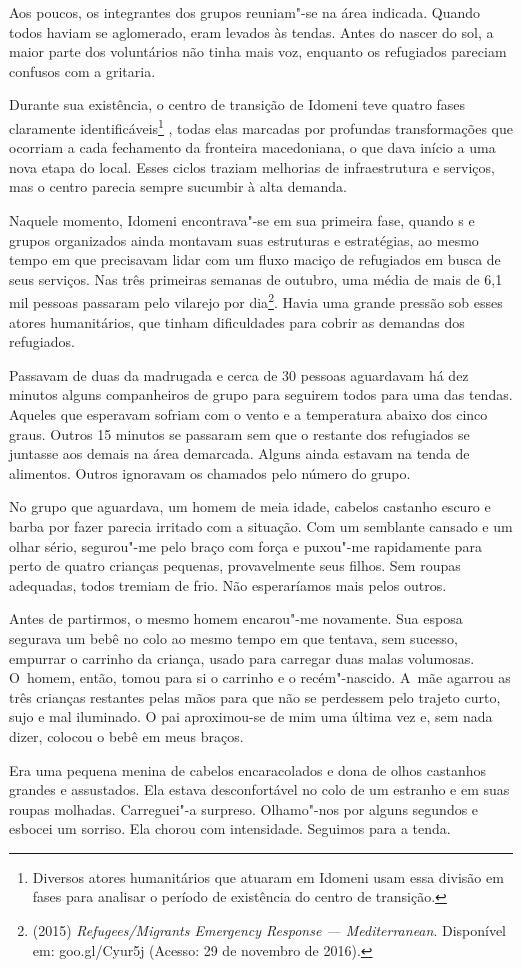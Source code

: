 Aos poucos, os integrantes dos grupos reuniam"-se na área indicada.
Quando todos haviam se aglomerado, eram levados às tendas. Antes do
nascer do sol, a maior parte dos voluntários não tinha mais voz,
enquanto os refugiados pareciam confusos com a gritaria.

Durante sua existência, o centro de transição de Idomeni teve quatro
fases claramente identificáveis\footnote{ Diversos atores humanitários que atuaram em Idomeni
usam essa divisão em fases para analisar o período de existência do
centro de transição.} , todas elas marcadas
por profundas transformações que ocorriam a cada fechamento da fronteira
macedoniana, o que dava início a uma nova etapa do local. Esses ciclos
traziam melhorias de infraestrutura e serviços, mas o centro parecia
sempre sucumbir à alta demanda.

Naquele momento, Idomeni encontrava"-se em sua primeira fase, quando s
e grupos organizados ainda montavam suas estruturas e estratégias, ao
mesmo tempo em que precisavam lidar com um fluxo maciço de refugiados em
busca de seus serviços. Nas três primeiras semanas de outubro, uma média
de mais de 6,1 mil pessoas passaram pelo vilarejo por
dia\footnote{  (2015) \emph{Refugees/Migrants Emergency
Response --- Mediterranean}. Disponível em:
goo.gl/Cyur5j (Acesso: 29 de
novembro de 2016).}. Havia uma grande pressão sob esses atores
humanitários, que tinham dificuldades para cobrir as demandas dos
refugiados.

Passavam de duas da madrugada e cerca de 30 pessoas aguardavam há dez
minutos alguns companheiros de grupo para seguirem todos para uma 
das tendas. Aqueles que esperavam sofriam com o vento e a
temperatura abaixo dos cinco graus. Outros 15 minutos se passaram sem
que o restante dos refugiados se juntasse aos demais na área demarcada.
Alguns ainda estavam na tenda de alimentos. Outros ignoravam os chamados
pelo número do grupo.

No grupo que aguardava, um homem de meia idade, cabelos castanho escuro
e barba por fazer parecia irritado com a situação. Com um semblante
cansado e um olhar sério, segurou"-me pelo braço com força e puxou"-me
rapidamente para perto de quatro crianças pequenas, provavelmente seus
filhos. Sem roupas adequadas, todos tremiam de frio. Não esperaríamos
mais pelos outros.

Antes de partirmos, o mesmo homem encarou"-me novamente. Sua esposa
segurava um bebê no colo ao mesmo tempo em que tentava, sem sucesso,
empurrar o carrinho da criança, usado para carregar duas malas volumosas.
 O~homem, então, tomou para si o carrinho e o recém"-nascido. A~mãe
agarrou as três crianças restantes pelas mãos para que não se perdessem
pelo trajeto curto, sujo e mal iluminado. O pai aproximou-se de mim uma última 
vez e, sem nada dizer, colocou o bebê em meus braços.

Era uma pequena menina de cabelos encaracolados e dona de olhos castanhos grandes e assustados.
 Ela estava desconfortável no colo de um estranho
e em suas roupas molhadas. Carreguei"-a surpreso. Olhamo"-nos por alguns
segundos e esbocei um sorriso. Ela chorou com intensidade. Seguimos para
a tenda.
